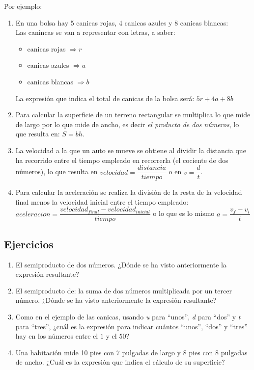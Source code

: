 Por ejemplo:
\begin{enumerate}
\item En una bolsa hay 5 canicas rojas, 4 canicas azules y 8 canicas blancas:\\
Las canincas se van a representar con letras, a saber:
\begin{itemize}
\item canicas rojas $\Rightarrow r$
\item canicas azules $\Rightarrow a$
\item canicas blancas $\Rightarrow b$
\end{itemize}
La expresión que indica el total de canicas de la bolsa será: $5r+4a+8b$
\item Para calcular la superficie de un terreno rectangular se multiplica lo que mide de largo por lo que mide de ancho, es decir \emph{el producto de dos números}, lo que resulta en: $S=bh$.
\item La velocidad a la que un auto se mueve se obtiene al dividir la distancia que ha recorrido entre el tiempo empleado en recorrerla (el cociente de dos números), lo que resulta en $velocidad=\dfrac{distancia}{tiempo}$ o en $v=\dfrac{d}{t}$.
\item Para calcular la aceleración se realiza la división de la resta de la velocidad final menos la velocidad inicial entre el tiempo empleado: $aceleracion=\dfrac{velocidad_{final} - velocidad_{inicial}}{tiempo}$ o lo que es lo mismo $a=\dfrac{v_f - v_i}{t}$
\end{enumerate}
\subsection{Ejercicios}
\begin{enumerate}
\item El semiproducto de dos números. ¿Dónde se ha visto anteriormente la expresión resultante?
\item El semiproducto de: la suma de dos números multiplicada por un tercer número. ¿Dónde se ha visto anteriormente la expresión resultante?
\item Como en el ejemplo de las canicas, usando \emph{u} para ``unos'', \emph{d} para ``dos'' y \emph{t} para ``tres'', ¿cuál es la expresión para indicar cuántos ``unos'', ``dos'' y ``tres'' hay en los números entre el $1$ y el $50$?
\item Una habitación mide 10 pies con 7 pulgadas de largo y 8 pies con 8 pulgadas de ancho. ¿Cuál es la expresión que indica el cálculo de su superficie?
\end{enumerate}
